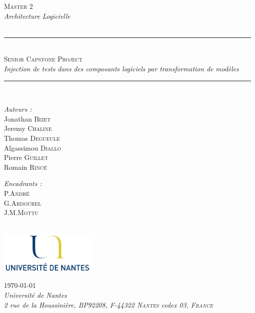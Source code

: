 \documentclass{report}
\newcommand{\HRule}{\rule{\linewidth}{0.5mm}}
\begin{document}

\begin{titlepage}
\pagestyle{empty}
\begin{center}
\textsc{\LARGE Master 2\\[0.15cm]}\emph{\LARGE Architecture Logicielle}\\
\hfill\\[1.5cm]
\HRule \\[0.4cm]
\textsc{\huge Senior Capstone Project}\\[0.5cm]
{\Large \emph{Injection de tests dans des composants logiciels par transformation de modèles}}\\[0.4cm]

\HRule \\[.5cm]

\begin{minipage}{0.4\textwidth}
\begin{flushleft} \large
\emph{Auteurs :}\\
Jonathan \textsc{Bizet}\\Jeremy \textsc{Chaline}\\Thomas \textsc{Degueule}\\Algassimou \textsc{Diallo}\\Pierre \textsc{Guillet}\\Romain \textsc{Rincé}
\end{flushleft}
\end{minipage}
\begin{minipage}{0.4\textwidth}
\begin{flushright} \large
\emph{Encadrants :} \\
P.\textsc{André}\\G.\textsc{Ardourel}\\J.M.\textsc{Mottu}
\end{flushright}
\end{minipage}\\[4cm]

\includegraphics[width=0.35\textwidth]{img/logouniv}

\vfill
\hfill



{\large \today}\\[0.5cm]
\emph{  Université de Nantes\\
2 rue de la Houssinière, BP92208, F-44322 \textsc{Nantes} cedex 03, \textsc{France}}\\

\end{center}

\end{titlepage}
\clearpage
\end{document}
